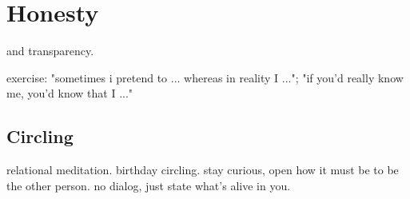 \chapter{Honesty}\label{ch:honesty}

and transparency.

exercise: "sometimes i pretend to ... whereas in reality I ..."; "if you'd really know me, you'd know that I ..."




\section{Circling}\label{sec:circling}

relational meditation. birthday circling. stay curious, open how it must be to be the other person.
no dialog, just state what's alive in you.